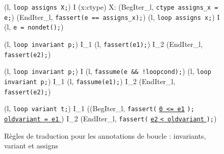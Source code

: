 \begin{figure*}[tb]
  \scriptsize{
  {
    {
      \splitfrac
      {
        (l, \mbox{\lstinline'loop assigns X;'}) 
      }
      {
        I \concat
        \forall (x:ctype) \not \in X:
        (BegIter_l, \mbox{\lstinline'ctype assigns_x = e;'})
        \concat (EndIter_l, \mbox{\lstinline'fassert(e == assigns_x);'})
      }
    }
  }
  {
    {(l, \mbox{\lstinline'loop assigns x;'})
      I \concat (l, \mbox{\lstinline'e = nondet();'})}
  }
  \vspace{-1mm}

 {
    {
      (l, \mbox{\lstinline'loop invariant p;'}) 
      I_1 \concat (l, \mbox{\lstinline'fassert(e1);'})
      \concat I_2 \concat (EndIter_l, \mbox{\lstinline'fassert(e2);'})
    }
  }

 {
    {
      (l, \mbox{\lstinline'loop invariant p;'}) 
      I \concat (l, \mbox{\lstinline'fassume(e && !loopcond);'})
    }
  }
 {
    {
      (l, \mbox{\lstinline'loop invariant p;'}) 
      I_1 \concat (l, \mbox{\lstinline'fassume(e1);'})
      \concat I_2 \concat (EndIter_l, \mbox{\lstinline'fassert(e2);'})
    }
  }
 \vspace{-1mm}

 {
   {
     \splitfrac
         {
           (l, \mbox{\lstinline'loop variant t;'}) 
         }
         {
           I_1 \concat ((BegIter_l,
           \mbox{\lstinline'fassert('}
           \underline{\mbox{\lstinline'0 <= e1'}}
           \mbox{\lstinline');' }
           \underline{\Zinit \mbox{\lstinline'oldvariant = e1'} \Zclear}
           \semicolon)
           \concat I_2
           \concat(EndIter_l,
           \mbox{\lstinline'fassert('}
           \underline{\mbox{\lstinline'e2'}\Zclear
             \mbox{\lstinline'< oldvariant'} \Zclear}
           \mbox{\lstinline');'})
         }
   }
 }
  }
  \caption{Règles de traduction pour les annotations de boucle : invariants,
    variant et assigns}
  \label{fig:loop-annot}
\end{figure*}

